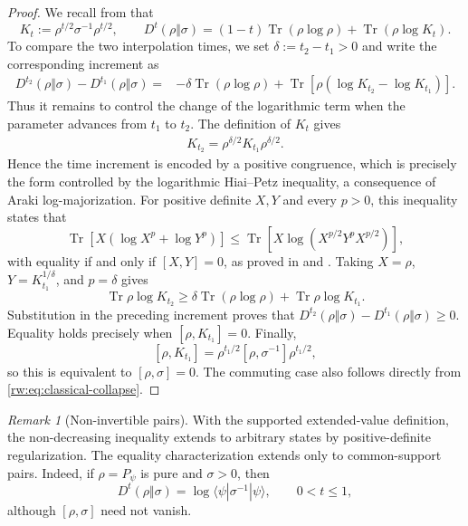 \documentclass[11pt]{article}
\theoremstyle{remark}
\newtheorem{remark}[remark]{Remark}
\newcommand{\1}{\mathbbm{1}}
\begin{document}
\begin{proof}
We recall from  that
\[
 K_t:=\rho^{t/2}\sigma^{-1}\rho^{t/2},
 \qquad
 D^t(\rho\Vert\sigma)
 =(1-t)\operatorname{Tr}(\rho\log\rho)
  +\operatorname{Tr}(\rho\log K_t).
\]
To compare the two interpolation times, we set
$\delta:=t_2-t_1>0$ and write the corresponding increment as
\[
 \begin{split}
 D^{t_2}(\rho\Vert\sigma)-D^{t_1}(\rho\Vert\sigma)
 ={}&-\delta\operatorname{Tr}(\rho\log\rho)+\operatorname{Tr}\!\left[
 \rho(\log K_{t_2}-\log K_{t_1})\right].
 \end{split}
\]
Thus it remains to control the change of the logarithmic term when
the parameter advances from $t_1$ to $t_2$.  The definition of $K_t$
gives
\[
 \begin{split}
 K_{t_2} =\rho^{\delta/2}K_{t_1}\rho^{\delta/2}.
 \end{split}
\]
Hence the time increment is encoded by a positive congruence, which
is precisely the form controlled by the logarithmic Hiai--Petz
inequality, a consequence of Araki log-majorization.  For positive
definite $X,Y$ and every $p>0$, this inequality states that
\[
 \operatorname{Tr}\!\left[X(\log X^p+\log Y^p)\right]
 \leq
 \operatorname{Tr}\!\left[
 X\log\!\left(X^{p/2}Y^pX^{p/2}\right)\right],
\]
with equality if and only if $[X,Y]=0$, as proved in
\cite[Theorem~2.1]{HIAI1993153} and
\cite[Theorem~2.3]{carlen2018some}.  Taking
$X=\rho$, $Y=K_{t_1}^{1/\delta}$, and $p=\delta$ gives
\begin{equation}
 \operatorname{Tr}\rho\log K_{t_2}
 \geq \delta\operatorname{Tr}(\rho\log\rho)
      +\operatorname{Tr}\rho\log K_{t_1}.
 \label{rw:eq:complementary-GT-step}
\end{equation}
Substitution in the preceding increment proves that
$D^{t_2}(\rho\Vert\sigma)-D^{t_1}(\rho\Vert\sigma)\geq0$.
Equality holds precisely when $[\rho,K_{t_1}]=0$.  Finally,
\[
 [\rho,K_{t_1}]
 =\rho^{t_1/2}[\rho,\sigma^{-1}]\rho^{t_1/2},
\]
so this is equivalent to $[\rho,\sigma]=0$.  The commuting case also
follows directly from \eqref{rw:eq:classical-collapse}.
\end{proof}

\begin{remark}[Non-invertible pairs]
With the supported extended-value definition, the non-decreasing
inequality extends to arbitrary states by positive-definite
regularization.  The equality characterization extends only to
common-support pairs.  Indeed, if $\rho=P_\psi$ is pure and
$\sigma>0$, then
\begin{equation}
 D^t(\rho\Vert\sigma)
 =\log\langle\psi|\sigma^{-1}|\psi\rangle,
 \qquad 0<t\leq1,
\end{equation}
although $[\rho,\sigma]$ need not vanish.
\end{remark}
\end{document}
